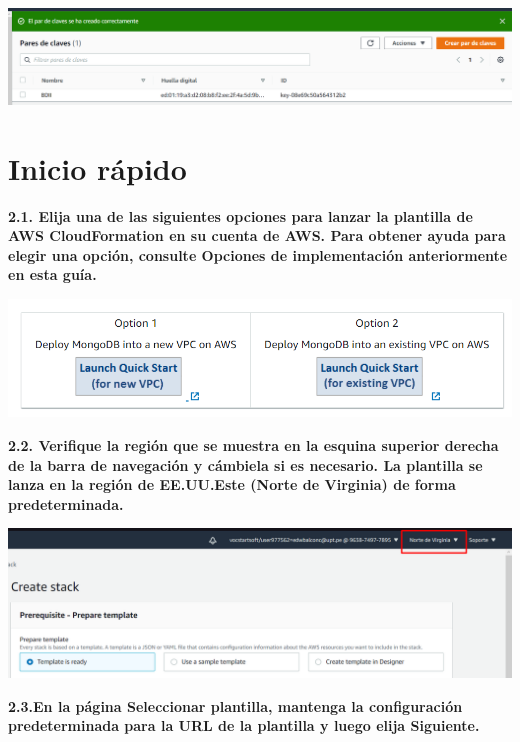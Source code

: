 \documentclass{article}
\begin{document}
\begin{center}
		\includegraphics[width=15cm]{./images/5} 
	\end{center}
	
\newpage
\section{Inicio rápido }
\textbf{2.1. 
Elija una de las siguientes opciones para lanzar la plantilla de AWS CloudFormation en su cuenta de AWS. Para obtener ayuda para elegir una opción, consulte Opciones de implementación anteriormente en esta guía.}
    \begin{center}
		\includegraphics[width=15cm]{./images/6} 
	\end{center}
\textbf{2.2.
Verifique la región que se muestra en la esquina superior derecha de la barra de navegación y cámbiela si es necesario. La plantilla se lanza en la región de EE.UU.Este (Norte de Virginia) de forma predeterminada.}

    \begin{center}
		\includegraphics[width=15cm]{./images/7} 
	\end{center}
	
\newpage
\textbf{2.3.En la página Seleccionar plantilla, mantenga la configuración predeterminada para la URL de la plantilla y luego elija Siguiente.
}
\end{document}
